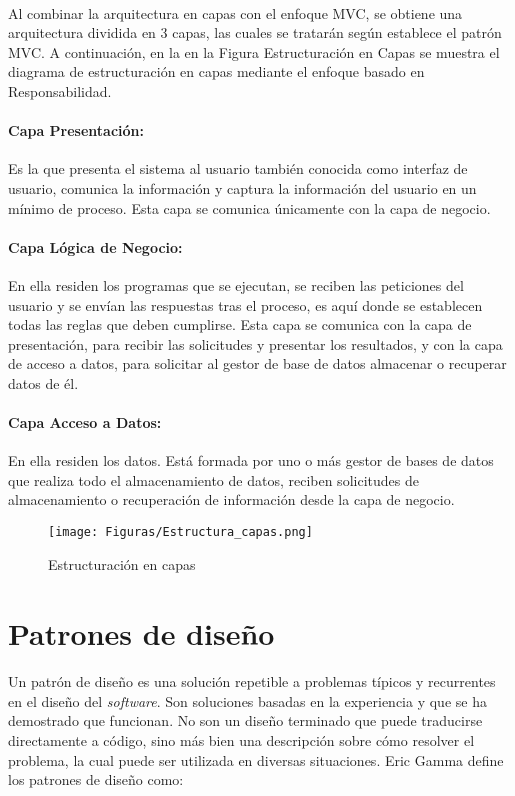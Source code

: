 \paragraph{}Al combinar la arquitectura en capas con el enfoque MVC, se obtiene una arquitectura dividida en 3 capas, las cuales se tratarán según establece el patrón MVC. A continuación, en la en la Figura Estructuración en Capas se muestra el diagrama de estructuración en capas mediante el enfoque basado en Responsabilidad.
\paragraph{Capa Presentación:}Es la que presenta el sistema al usuario también conocida como interfaz de usuario, comunica la información y captura la información del usuario en un mínimo de proceso. Esta capa se comunica únicamente con la capa de negocio. 
\paragraph{Capa Lógica de Negocio:}En ella residen los programas que se ejecutan, se reciben las peticiones del usuario y se envían las respuestas tras el proceso, es aquí donde se establecen todas las reglas que deben cumplirse. Esta capa se comunica con la capa de presentación, para recibir las solicitudes y presentar los resultados, y con la capa de acceso a datos, para solicitar al gestor de base de datos almacenar o recuperar datos de él. 
\paragraph{Capa Acceso a Datos:}En ella residen los datos. Está formada por uno o más gestor de bases de datos que realiza todo el almacenamiento de datos, reciben solicitudes de almacenamiento o recuperación de información desde la capa de negocio.

\begin{figure}[H] %
	\centering
	\texttt{[image: Figuras/Estructura\_capas.png]}
	\caption{Estructuración en capas}
	\label{fig:Capas}
\end{figure}

\section{Patrones de diseño}
\paragraph{}Un patrón de diseño es una solución repetible a problemas típicos y recurrentes en el diseño del \textit{software}. Son soluciones basadas en la experiencia y que se ha demostrado que funcionan. No son un diseño terminado que puede traducirse directamente a código, sino más bien una descripción sobre cómo resolver el problema, la cual puede ser utilizada en diversas situaciones. Eric Gamma define los patrones de diseño como:
